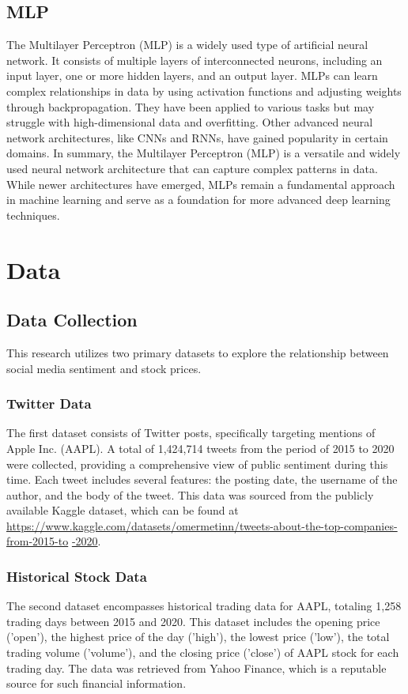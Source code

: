 \documentclass[11pt,a4paper]{article}
\begin{document}
\subsection{MLP}
The Multilayer Perceptron (MLP) is a widely used type of artificial neural network. It consists of multiple layers of interconnected neurons, including an input layer, one or more hidden layers, and an output layer. MLPs can learn complex relationships in data by using activation functions and adjusting weights through backpropagation. They have been applied to various tasks but may struggle with high-dimensional data and overfitting. Other advanced neural network architectures, like CNNs and RNNs, have gained popularity in certain domains. In summary, the Multilayer Perceptron (MLP) is a versatile and widely used neural network architecture that can capture complex patterns in data. While newer architectures have emerged, MLPs remain a fundamental approach in machine learning and serve as a foundation for more advanced deep learning techniques.



\section{Data}
\subsection{Data Collection}
This research utilizes two primary datasets to explore the relationship between social media sentiment and stock prices.

\subsubsection{Twitter Data}
The first dataset consists of Twitter posts, specifically targeting mentions of Apple Inc. (AAPL). A total of 1,424,714 tweets from the period of 2015 to 2020 were collected, providing a comprehensive view of public sentiment during this time. Each tweet includes several features: the posting date, the username of the author, and the body of the tweet. This data was sourced from the publicly available Kaggle dataset, which can be found at \url{https://www.kaggle.com/datasets/omermetinn/tweets-about-the-top-companies-from-2015-to}
\url{-2020}.

\subsubsection{Historical Stock Data}
The second dataset encompasses historical trading data for AAPL, totaling 1,258 trading days between 2015 and 2020. This dataset includes the opening price ('open'), the highest price of the day ('high'), the lowest price ('low'), the total trading volume ('volume'), and the closing price ('close') of AAPL stock for each trading day. The data was retrieved from Yahoo Finance, which is a reputable source for such financial information.
\end{document}
